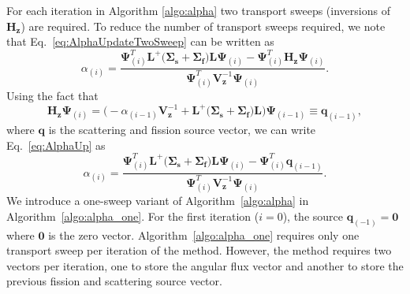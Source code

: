 For each iteration in Algorithm \ref{algo:alpha} two transport sweeps (inversions of $\mathbf{H_{z}}$) are required. To reduce the number of transport sweeps required, we note that Eq.~\ref{eq:AlphaUpdateTwoSweep} can be written as
\begin{equation}
	\alpha_{(i)} = \frac{ \mathbf{\Psi}^{T}_{(i)} \mathbf{L}^{+} \big ( \mathbf{\Sigma_{s}} + \mathbf{\Sigma_{f}} \big ) \mathbf{L} \mathbf{\Psi}_{(i)} -  \mathbf{\Psi}^{T}_{(i)}  \mathbf{H_{z}} \mathbf{\Psi}_{(i)}}{  \mathbf{\Psi}^{T}_{(i)} \mathbf{V}^{-1}_{\mathbf{z}}  \mathbf{\Psi}_{(i)}}.
	\label{eq:AlphaUp}
\end{equation}
Using the fact that 
\begin{equation}
\mathbf{H_{z}} \mathbf{\Psi}_{(i)} =  \bigg ( -\alpha_{(i-1)} \mathbf{V}_{\mathbf{z}}^{-1} + \mathbf{L}^{+} \big ( \mathbf{\Sigma_{s}} + \mathbf{\Sigma_{f}} \big ) \mathbf{L} \bigg ) \mathbf{\Psi}_{(i-1)} \equiv \mathbf{q}_{(i-1)},
\end{equation}
where $\mathbf{q}$ is the scattering and fission source vector, we can write Eq.~\ref{eq:AlphaUp} as
\begin{equation}
	\alpha_{(i)} = \frac{ \mathbf{\Psi}^{T}_{(i)} \mathbf{L}^{+} \big ( \mathbf{\Sigma_{s}} + \mathbf{\Sigma_{f}} \big ) \mathbf{L} \mathbf{\Psi}_{(i)} -  \mathbf{\Psi}^{T}_{(i)}  \mathbf{q}_{(i-1)}}{  \mathbf{\Psi}^{T}_{(i)} \mathbf{V}^{-1}_{\mathbf{z}}  \mathbf{\Psi}_{(i)}}.
	\label{eq:AlphaUp}
\end{equation}
We introduce a one-sweep variant of Algorithm~\ref{algo:alpha} in Algorithm~\ref{algo:alpha_one}. For the first iteration ($i=0$), the source $\mathbf{q}_{(-1)} = \mathbf{0}$ where $\mathbf{0}$ is the zero vector. Algorithm~\ref{algo:alpha_one} requires only one transport sweep per iteration of the method. However, the method requires two vectors per iteration, one to store the angular flux vector and another to store the previous fission and scattering source vector.
